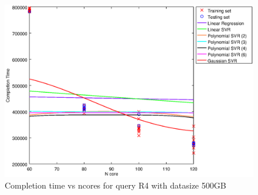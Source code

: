 
\begin {figure}[hbtp]
\centering
\includegraphics[width=\textwidth]{output/R4_500_LINEAR_NCORE/plot_R4_500.eps}
\caption{Completion time vs ncores for query R4 with datasize 500GB}
\label{fig:coreonly_linear_R4_500}
\end {figure}
